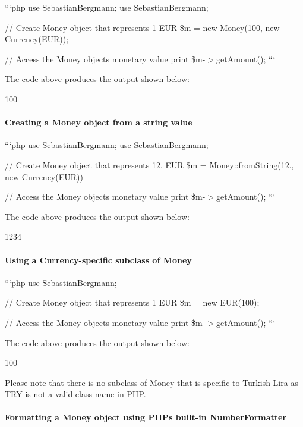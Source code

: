 ```php use Sebastian\+Bergmann; use Sebastian\+Bergmann;

// Create Money object that represents 1 E\+U\+R \$m = new Money(100, new Currency(\textquotesingle{}E\+U\+R\textquotesingle{}));

// Access the Money object\textquotesingle{}s monetary value print \$m-\/$>$get\+Amount(); ```

The code above produces the output shown below\+: \begin{DoxyVerb}100
\end{DoxyVerb}


\paragraph*{Creating a Money object from a string value}

```php use Sebastian\+Bergmann; use Sebastian\+Bergmann;

// Create Money object that represents 12. E\+U\+R \$m = Money\+::from\+String(\textquotesingle{}12.\textquotesingle{}, new Currency(\textquotesingle{}E\+U\+R\textquotesingle{}))

// Access the Money object\textquotesingle{}s monetary value print \$m-\/$>$get\+Amount(); ```

The code above produces the output shown below\+: \begin{DoxyVerb}1234
\end{DoxyVerb}


\paragraph*{Using a Currency-\/specific subclass of Money}

```php use Sebastian\+Bergmann;

// Create Money object that represents 1 E\+U\+R \$m = new E\+U\+R(100);

// Access the Money object\textquotesingle{}s monetary value print \$m-\/$>$get\+Amount(); ```

The code above produces the output shown below\+: \begin{DoxyVerb}100
\end{DoxyVerb}


Please note that there is no subclass of {\ttfamily Money} that is specific to Turkish Lira as {\ttfamily T\+R\+Y} is not a valid class name in P\+H\+P.

\paragraph*{Formatting a Money object using P\+H\+P\textquotesingle{}s built-\/in Number\+Formatter}

